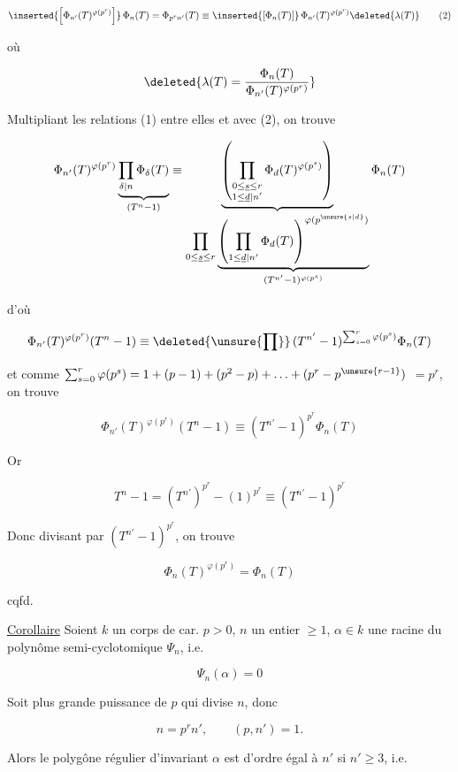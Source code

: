 \[
\inserted{\left[\Phi_{n'}(T)^{\varphi(p^r)}\right]}\,\Phi_n(T)=\Phi_{p^rn'}(T)\equiv\inserted{[\Phi_n(T)]}\,\Phi_{n'}(T)^{\varphi(p^r)}\deleted{\lambda(T)}\tag*{(2)}
\]

où

\[
\deleted{\lambda(T)=\frac{\Phi_n(T)}{\Phi_{n'}(T)^{\varphi(p^r)}}}
\]

Multipliant les relations (1) entre elles et avec (2), on trouve

\[
\Phi_{n'}(T)^{\varphi(p^r)}
\underbrace{\prod_{\delta\mid n}\Phi_\delta(T)}_{(T^n-1)}
\equiv\underbrace{\left(\prod_{\substack{0\leq\underline{s}\leq r\\1\leq\underline{d}\mid n'}}\Phi_d(T)^{\varphi(p^s)}\right)}_{
\displaystyle\prod_{0\leq\underline{s}\leq r}\underbrace{\left(\prod_{1\leq\underline{d}\mid n'}\Phi_d(T)\right)^{\varphi(p^{\unsure{s|d}})}}_{(T^{n'}-1)^{\varphi(p^s)}}}\Phi_n(T)
\]



d'où

\[
\Phi_{n'}(T)^{\varphi(p^r)}(T^n-1)\equiv\deleted{\unsure{\prod}}\,(T^{n'}-1)^{\sum_{s=0}^r\varphi(p^s)}\Phi_n(T)
\]

et comme $\sum_{s=0}^r\varphi(p^s)=1+(p-1)+(p^2-p)+\ldots+(p^r-p^{\unsure{r-1}})$ $=p^r$, on trouve

\[
\Phi_{n'}(T)^{\varphi(p^r)}(T^n-1)\equiv(T^{n'}-1)^{p^r}\Phi_n(T)
\]

Or

\[
T^n-1=(T^{n'})^{p^r}-(1)^{p^r}\equiv(T^{n'}-1)^{p^r}
\]

 Donc divisant par $(T^{n'}-1)^{p^r}$, on trouve

\[
\Phi_n(T)^{\varphi(p^r)}=\Phi_n(T)
\]

\hfill cqfd.

\uline{Corollaire} Soient $k$ un corps de car. $p>0$, $n$ un entier  $\geq1$, $\alpha\in k$ une racine du polynôme semi-cyclotomique $\Psi_n$, i.e.

\[
\Psi_n(\alpha)=0
\]

Soit   plus grande puissance de $p$ qui divise $n$, donc

\[
n=p^rn',\qquad(p,n')=1.
\]

Alors le polygône régulier d'invariant $\alpha$ est d'ordre égal à $n'$ si $n'\geq3$, i.e.


